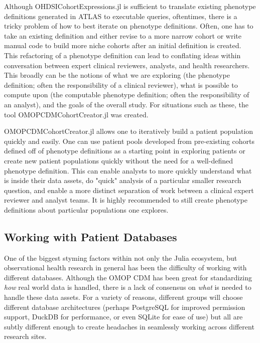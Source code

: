 \documentclass{juliacon}
\begin{document}
Although OHDSICohortExpressions.jl is sufficient to translate existing phenotype definitions generated in ATLAS to executable queries, oftentimes, there is a tricky problem of how to best iterate on phenotype definitions. \cite{zelkoDevelopingRobustComputable2023}
Often, one has to take an existing definition and either revise to a more narrow cohort or write manual code to build more niche cohorts after an initial definition is created.
This refactoring of a phenotype definition can lead to conflating ideas within conversation between expert clinical reviewers, analysts, and health researchers.
This broadly can be the notions of what we are exploring (the phenotype definition; often the responsibility of a clinical reviewer), what is possible to compute upon (the computable phenotype definition; often the responsibility of an analyst), and the goals of the overall study.
For situations such as these, the tool OMOPCDMCohortCreator.jl was created.

OMOPCDMCohortCreator.jl allows one to iteratively build a patient population quickly and easily.
One can use patient pools developed from pre-existing cohorts defined off of phenotype definitions as a starting point in exploring patients or create new patient populations quickly without the need for a well-defined phenotype definition.
This can enable analysts to more quickly understand what is inside their data assets, do "quick" analysis of a particular smaller research question, and enable a more distinct separation of work between a clinical expert reviewer and analyst teams.
It is highly recommended to still create phenotype definitions about particular populations one explores.


\subsection{Working with Patient Databases}

One of the biggest styming factors within not only the Julia ecosystem, but observational health research in general has been the difficulty of working with different databases.
Although the OMOP CDM has been great for standardizing \textit{how} real world data is handled, there is a lack of consensus on \textit{what} is needed to handle these data assets.
For a variety of reasons, different groups will choose different database architectures (perhaps PostgreSQL for improved permission support, DuckDB for performance, or even SQLite for ease of use) but all are subtly different enough to create headaches in seamlessly working across different research sites.
\end{document}
